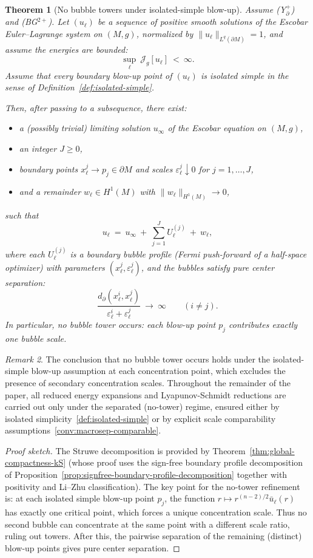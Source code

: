 \documentclass[11pt,reqno,a4paper]{amsart}
\numberwithin{equation}{section}
\theoremstyle{plain}
\newtheorem{theorem}{Theorem}[section]
\theoremstyle{remark}
\newtheorem{remark}[theorem]{Remark}
\theoremstyle{plain}
\begin{document}
\begin{theorem}[No bubble towers under isolated-simple blow-up]\label{thm:no-tower-isolated-simple}
Assume \textup{(Y$^+_{\partial}$)} and \textup{(BG$^{2+}$)}.
Let $(u_\ell)$ be a sequence of positive smooth solutions of the Escobar Euler--Lagrange system on $(M,g)$,
normalized by $\|u_\ell\|_{L^q(\partial M)}=1$, and assume the energies are bounded:
\[
\sup_{\ell}\ \mathcal J_g[u_\ell]\ <\ \infty.
\]
Assume that every boundary blow-up point of $(u_\ell)$ is \emph{isolated simple} in the sense of
Definition~\ref{def:isolated-simple}.

Then, after passing to a subsequence, there exist:
\begin{itemize}
\item a (possibly trivial) limiting solution $u_\infty$ of the Escobar equation on $(M,g)$,
\item an integer $J\ge0$,
\item boundary points $x_\ell^j\to p_j\in\partial M$ and scales $\varepsilon_\ell^j\downarrow0$ for $j=1,\dots,J$,
\item and a remainder $w_\ell\in H^1(M)$ with $\|w_\ell\|_{H^1(M)}\to0$,
\end{itemize}
such that
\[
u_\ell\ =\ u_\infty\ +\ \sum_{j=1}^{J} U^{(j)}_\ell\ +\ w_\ell,
\]
where each $U^{(j)}_\ell$ is a boundary bubble profile (Fermi push-forward of a half-space optimizer)
with parameters $(x_\ell^j,\varepsilon_\ell^j)$, and the bubbles satisfy \emph{pure center separation}:
\[
\frac{d_\partial(x_\ell^i,x_\ell^j)}{\varepsilon_\ell^i+\varepsilon_\ell^j}\ \longrightarrow\ \infty
\qquad(i\neq j).
\]
In particular, \emph{no bubble tower occurs}: each blow-up point $p_j$ contributes \emph{exactly one} bubble scale.
\end{theorem}

\begin{remark}
The conclusion that no bubble tower occurs holds under the isolated-simple blow-up assumption at each concentration point, which excludes the presence of secondary concentration scales. Throughout the remainder of the paper, all reduced energy expansions and Lyapunov-Schmidt reductions are carried out only under the separated (no-tower) regime, ensured either by isolated simplicity~\eqref{def:isolated-simple} or by explicit scale comparability assumptions~\eqref{conv:macrosep-comparable}.
\end{remark}

\begin{proof}[Proof sketch]
The Struwe decomposition is provided by Theorem~\ref{thm:global-compactness-kS}
(whose proof uses the sign-free boundary profile decomposition of
Proposition~\ref{prop:signfree-boundary-profile-decomposition} together with
positivity and Li--Zhu classification).  The key point for the no-tower
refinement is: at each isolated simple blow-up point $p_j$, the function
$r\mapsto r^{(n-2)/2}\bar u_\ell(r)$ has exactly one critical point, which
forces a unique concentration scale.  Thus no second bubble can concentrate at
the same point with a different scale ratio, ruling out towers.  After this,
the pairwise separation of the remaining (distinct) blow-up points gives pure
center separation.
\end{proof}
\end{document}
